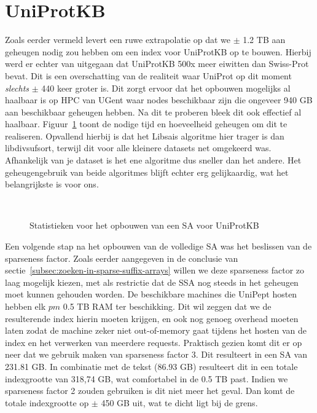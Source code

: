 \section{UniProtKB}
Zoals eerder vermeld levert een ruwe extrapolatie op dat we $\pm$ 1.2 TB aan geheugen nodig zou hebben om een index voor UniProtKB op te bouwen.
Hierbij werd er echter van uitgegaan dat UniProtKB 500x meer eiwitten dan Swiss-Prot bevat.
Dit is een overschatting van de realiteit waar UniProt op dit moment \textit{slechts} $\pm$ 440 keer groter is.
Dit zorgt ervoor dat het opbouwen mogelijks al haalbaar is op HPC van UGent waar nodes beschikbaar zijn die ongeveer 940 GB aan beschikbaar geheugen hebben.
Na dit te proberen bleek dit ook effectief al haalbaar.
Figuur~\ref{fig:build_uniprot} toont de nodige tijd en hoeveelheid geheugen om dit te realiseren.
Opvallend hierbij is dat het Libsais algoritme hier trager is dan libdivsufsort, terwijl dit voor alle kleinere datasets net omgekeerd was.
Afhankelijk van je dataset is het ene algoritme dus sneller dan het andere.
Het geheugengebruik van beide algoritmes blijft echter erg gelijkaardig, wat het belangrijkste is voor ons.
\\
\begin{figure}[H]
    \centering
    \\[4ex] %

    \caption{Statistieken voor het opbouwen van een SA voor UniProtKB}\label{fig:build_uniprot}
\end{figure}

Een volgende stap na het opbouwen van de volledige SA was het beslissen van de sparseness factor.
Zoals eerder aangegeven in de conclusie van sectie~\ref{subsec:zoeken-in-sparse-suffix-arrays} willen we deze sparseness factor zo laag mogelijk kiezen, met als restrictie dat de SSA nog steeds in het geheugen moet kunnen gehouden worden.
De beschikbare machines die UniPept hosten hebben elk $pm$ 0.5 TB RAM ter beschikking.
Dit wil zeggen dat we de resulterende index hierin moeten krijgen, en ook nog genoeg overhead moeten laten zodat de machine zeker niet out-of-memory gaat tijdens het hosten van de index en het verwerken van meerdere requests.
Praktisch gezien komt dit er op neer dat we gebruik maken van sparseness factor 3. %
Dit resulteert in een SA van 231.81 GB.
In combinatie met de tekst (86.93 GB) resulteert dit in een totale indexgrootte van 318,74 GB, wat comfortabel in de 0.5 TB past.
Indien we sparseness factor 2 zouden gebruiken is dit niet meer het geval. %
Dan komt de totale indexgrootte op $\pm$ 450 GB uit, wat te dicht ligt bij de grens.
